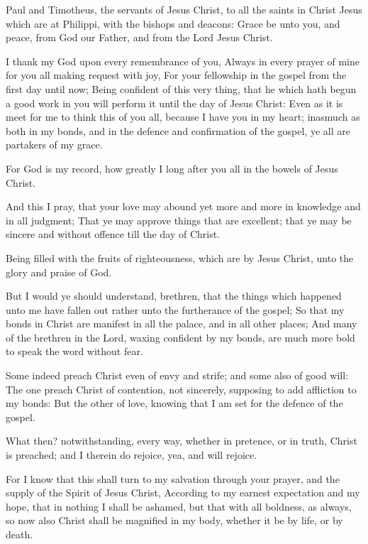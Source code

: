 \Chapter
\Verse Paul and Timotheus, the servants of Jesus Christ, to all the saints in Christ Jesus which are at Philippi, with the bishops and deacons: \Verse Grace be unto you, and peace, from God our Father, and from the Lord Jesus Christ.

\Verse I thank my God upon every remembrance of you, \Verse Always in every prayer of mine for you all making request with joy, \Verse For your fellowship in the gospel from the first day until now; \Verse Being confident of this very thing, that he which hath begun a good work in you will perform it until the day of Jesus Christ: \Verse Even as it is meet for me to think this of you all, because I have you in my heart; inasmuch as both in my bonds, and in the defence and confirmation of the gospel, ye all are partakers of my grace.

\Verse For God is my record, how greatly I long after you all in the bowels of Jesus Christ.

\Verse And this I pray, that your love may abound yet more and more in knowledge and in all judgment; \Verse That ye may approve things that are excellent; that ye may be sincere and without offence till the day of Christ.

\Verse Being filled with the fruits of righteousness, which are by Jesus Christ, unto the glory and praise of God.

\Verse But I would ye should understand, brethren, that the things which happened unto me have fallen out rather unto the furtherance of the gospel; \Verse So that my bonds in Christ are manifest in all the palace, and in all other places; \Verse And many of the brethren in the Lord, waxing confident by my bonds, are much more bold to speak the word without fear.

\Verse Some indeed preach Christ even of envy and strife; and some also of good will: \Verse The one preach Christ of contention, not sincerely, supposing to add affliction to my bonds: \Verse But the other of love, knowing that I am set for the defence of the gospel.

\Verse What then? notwithstanding, every way, whether in pretence, or in truth, Christ is preached; and I therein do rejoice, yea, and will rejoice.

\Verse For I know that this shall turn to my salvation through your prayer, and the supply of the Spirit of Jesus Christ, \Verse According to my earnest expectation and my hope, that in nothing I shall be ashamed, but that with all boldness, as always, so now also Christ shall be magnified in my body, whether it be by life, or by death.

